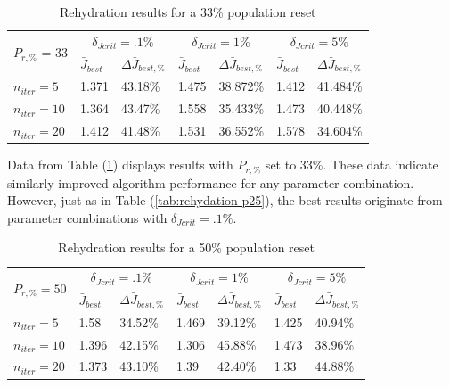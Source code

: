 \begin{table}[H]
  \centering
  \begin{tabular}{lll|ll|ll}
    \toprule
    \multirow{2}{*}{$P_{r,\text{\%}}$ = 33} &
      \multicolumn{2}{c}{$\delta_{Jcrit} = .1\%$ } &
      \multicolumn{2}{c}{$\delta_{Jcrit} = 1\%$ } &
      \multicolumn{2}{c}{$\delta_{Jcrit} = 5\%$ } \\
      \cmidrule{2-7}
    & $\bar{J}_{best}$ & $\Delta \bar{J}_{best,\text{\%}}$ & $\bar{J}_{best}$ & $\Delta \bar{J}_{best,\text{\%}}$ & $\bar{J}_{best}$ & $\Delta \bar{J}_{best,\text{\%}}$ \\
    \midrule

    $n_{iter}=5$ & 1.371 & 43.18\% & 1.475 & 38.872\% & 1.412 & 41.484\% \\
    $n_{iter}=10$ & 1.364 & 43.47\% & 1.558 & 35.433\% & 1.473 & 40.448\% \\
    $n_{iter}=20$ & 1.412 & 41.48\% & 1.531 & 36.552\% & 1.578 & 34.604\% \\
    \bottomrule
  \end{tabular}
  \caption{Rehydration results for a 33\% population reset}
  \label{tab:rehydation-p33}
\end{table}

\noindent Data from Table (\ref{tab:rehydation-p33}) displays results with $P_{r,\text{\%}}$ set to 33\%. These data indicate similarly
improved algorithm performance for any parameter combination. However, just as in Table (\ref{tab:rehydation-p25}), the best results
originate from parameter combinations with $\delta_{Jcrit} = .1\%$.

\begin{table}[H]
    \centering
    \begin{tabular}{lll|ll|ll}
      \toprule
      \multirow{2}{*}{$P_{r,\text{\%}} = 50$} &
        \multicolumn{2}{c}{$\delta_{Jcrit} = .1\%$ } &
        \multicolumn{2}{c}{$\delta_{Jcrit} = 1\%$ } &
        \multicolumn{2}{c}{$\delta_{Jcrit} = 5\%$ } \\
        \cmidrule{2-7}
      & $\bar{J}_{best}$ & $\Delta \bar{J}_{best,\text{\%}}$ & $\bar{J}_{best}$ & $\Delta \bar{J}_{best,\text{\%}}$ & $\bar{J}_{best}$ & $\Delta \bar{J}_{best,\text{\%}}$ \\
      \midrule

      $n_{iter}=5$ & 1.58 & 34.52\% & 1.469 & 39.12\% & 1.425 & 40.94\% \\
      $n_{iter}=10$ & 1.396 & 42.15\% & 1.306 & 45.88\% & 1.473 & 38.96\% \\
      $n_{iter}=20$ & 1.373 & 43.10\% & 1.39 & 42.40\% & 1.33 & 44.88\% \\
      \bottomrule
    \end{tabular}
    \caption{Rehydration results for a 50\% population reset}
    \label{tab:rehydation-p50}
  \end{table}

